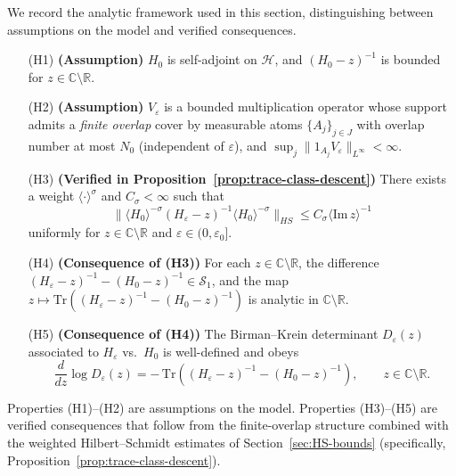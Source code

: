﻿\documentclass[12pt,a4paper]{article}
\theoremstyle{definition}
\theoremstyle{remark}
\begin{document}
We record the analytic framework used in this section, distinguishing between assumptions on the model and verified consequences.

\begin{itemize}
  \item[(H1)] \textbf{(Assumption)} $H_0$ is self-adjoint on $\mathcal{H}$, and $(H_0-z)^{-1}$ is bounded for $z\in\mathbb{C}\setminus\mathbb{R}$.
  
  \item[(H2)] \textbf{(Assumption)} $V_\varepsilon$ is a bounded multiplication operator whose support admits a \emph{finite overlap} cover by measurable atoms $\{A_j\}_{j\in J}$ with overlap number at most $N_0$ (independent of $\varepsilon$), and $\sup_j \|1_{A_j}V_\varepsilon\|_{L^\infty}<\infty$.
  
  \item[(H3)] \textbf{(Verified in Proposition~\ref{prop:trace-class-descent})} There exists a weight $\langle \cdot\rangle^\sigma$ and $C_\sigma<\infty$ such that
  \[
  \|\langle H_0\rangle^{-\sigma}(H_\varepsilon-z)^{-1}\langle H_0\rangle^{-\sigma}\|_{HS}\le C_\sigma\langle \mathrm{Im}\,z\rangle^{-1}
  \]
  uniformly for $z\in\mathbb{C}\setminus\mathbb{R}$ and $\varepsilon\in(0,\varepsilon_0]$.
  
  \item[(H4)] \textbf{(Consequence of (H3))} For each $z\in\mathbb{C}\setminus\mathbb{R}$, the difference $(H_\varepsilon-z)^{-1}-(H_0-z)^{-1}\in \mathcal{S}_1$, and the map $z\mapsto \mathrm{Tr}((H_\varepsilon-z)^{-1}-(H_0-z)^{-1})$ is analytic in $\mathbb{C}\setminus\mathbb{R}$.
  
  \item[(H5)] \textbf{(Consequence of (H4))} The Birman--Krein determinant $D_\varepsilon(z)$ associated to $H_\varepsilon$ vs.\ $H_0$ is well-defined and obeys
  \begin{equation}\label{eq:BK-log-derivative}
  \frac{d}{dz}\log D_\varepsilon(z)= -\,\mathrm{Tr}\!\left((H_\varepsilon-z)^{-1}-(H_0-z)^{-1}\right),
  \qquad z\in\mathbb{C}\setminus\mathbb{R}.
  \end{equation}
\end{itemize}

Properties (H1)--(H2) are assumptions on the model. Properties (H3)--(H5) are verified consequences that follow from the finite-overlap structure combined with the weighted Hilbert--Schmidt estimates of Section~\ref{sec:HS-bounds} (specifically, Proposition~\ref{prop:trace-class-descent}).
\end{document}
